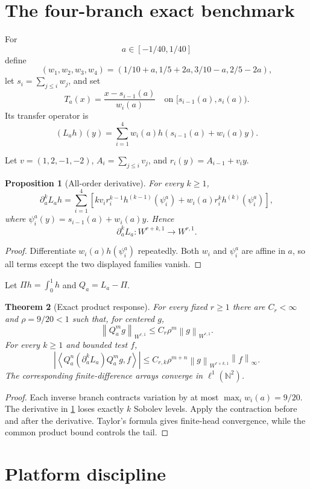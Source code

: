 \documentclass[11pt,reqno]{amsart}
\newtheorem{theorem}{Theorem}[section]
\newtheorem{proposition}[theorem]{Proposition}
\theoremstyle{definition}
\theoremstyle{remark}
\newcommand{\N}{\mathbb N}
\newcommand{\norm}[1]{\left\lVert #1\right\rVert}
\newcommand{\abs}[1]{\left\lvert #1\right\rvert}
\newcommand{\pair}[2]{\left\langle #1,#2\right\rangle}
\begin{document}
\section{The four-branch exact benchmark}\label{sec:four-branch}

For
\[
 a\in[-1/40,1/40]
\]
define
\[
 (w_1,w_2,w_3,w_4)
 =(1/10+a,1/5+2a,3/10-a,2/5-2a),
\]
let $s_i=\sum_{j\le i}w_j$, and set
\[
 T_a(x)=\frac{x-s_{i-1}(a)}{w_i(a)}
 \quad\text{on }[s_{i-1}(a),s_i(a)).
\]
Its transfer operator is
\[
 (L_ah)(y)
 =\sum_{i=1}^4w_i(a)
 h(s_{i-1}(a)+w_i(a)y).
\]

Let $v=(1,2,-1,-2)$,
$A_i=\sum_{j\le i}v_j$, and
$r_i(y)=A_{i-1}+v_iy$.

\begin{proposition}[All-order derivative]\label{prop:all-order}
For every $k\ge1$,
\[
 \partial_a^kL_ah
 =
 \sum_{i=1}^4
 \left[
 k v_i r_i^{k-1}h^{(k-1)}(\psi_i^a)
 +w_i(a)r_i^kh^{(k)}(\psi_i^a)
 \right],
\]
where $\psi_i^a(y)=s_{i-1}(a)+w_i(a)y$.  Hence
\[
 \partial_a^kL_a:W^{r+k,1}\longrightarrow W^{r,1}.
\]
\end{proposition}

\begin{proof}
Differentiate
$w_i(a)h(\psi_i^a)$ repeatedly.  Both $w_i$ and $\psi_i^a$ are affine in
$a$, so all terms except the two displayed families vanish.
\end{proof}

Let $\Pi h=\int_0^1h$ and $Q_a=L_a-\Pi$.

\begin{theorem}[Exact product response]\label{thm:four-branch-product}
For every fixed $r\ge1$ there are $C_r<\infty$ and
$\rho=9/20<1$ such that, for centered $g$,
\[
 \norm{Q_a^mg}_{W^{r,1}}\le C_r\rho^m\norm g_{W^{r,1}}.
\]
For every $k\ge1$ and bounded test $f$,
\[
 \abs{\pair{Q_a^n(\partial_a^kL_a)Q_a^mg}{f}}
 \le C_{r,k}\rho^{m+n}
 \norm g_{W^{r+k,1}}\norm f_\infty.
\]
The corresponding finite-difference arrays converge in
$\ell^1(\N^2)$.
\end{theorem}

\begin{proof}
Each inverse branch contracts variation by at most $\max_iw_i(a)=9/20$.
The derivative in \cref{prop:all-order} loses exactly $k$ Sobolev levels.
Apply the contraction before and after the derivative.  Taylor's formula gives
finite-head convergence, while the common product bound controls the tail.
\end{proof}

\section{Platform discipline}\label{sec:platform}
\end{document}

